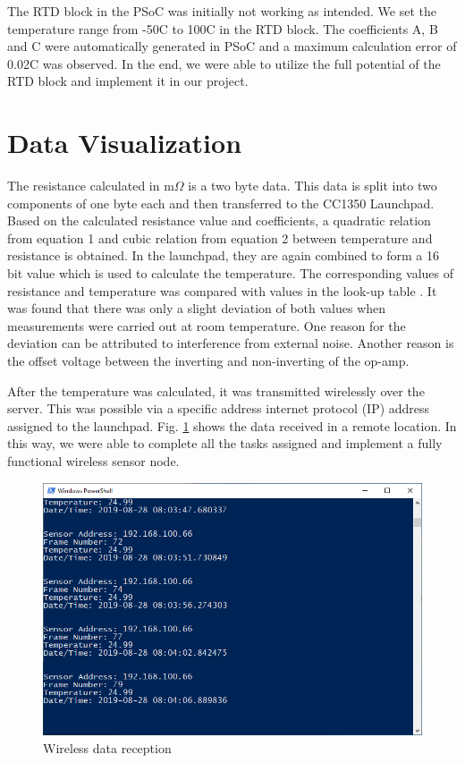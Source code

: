 \documentclass[conference]{IEEEtran}
\begin{document}
  The RTD block in the PSoC was initially not working as intended. We set the temperature range from -50\textdegree C to 100\textdegree C in the RTD block. The coefficients A, B and C were automatically generated in PSoC and a maximum calculation error of 0.02\textdegree C was observed. In the end, we were able to utilize the full potential of the RTD block and implement it in our project.
 
 \section{Data Visualization}
 
The resistance calculated in m$\Omega$ is a two byte data.  This data is split into two components of one byte each and then transferred to the CC1350 Launchpad. Based on the calculated resistance value and coefficients, a quadratic relation from equation 1 and cubic relation from equation 2 between temperature and resistance is obtained.  In the launchpad, they are again combined to form a 16 bit value which is used to calculate the temperature. The corresponding values of resistance and temperature was compared with values in the look-up table \cite{b4}. It was found that there was only a slight deviation of both values when measurements were carried out at room temperature. One reason for the deviation can be attributed to interference from external noise. Another reason is the offset voltage between the inverting and non-inverting of the op-amp.
 
After the temperature was calculated, it was transmitted wirelessly over the server. This was possible via a specific address internet protocol (IP) address assigned to the launchpad. Fig. \ref{fig:receiver} shows the data received in a remote location. In this way, we were able to complete all the tasks assigned and implement a fully functional wireless sensor node.
\begin{figure}[htbp]
	\centerline{\includegraphics[width=\columnwidth, height=0.3\textheight]{temp_server}}
	\caption{Wireless data reception}
	\label{fig:receiver}
\end{figure}
\end{document}
